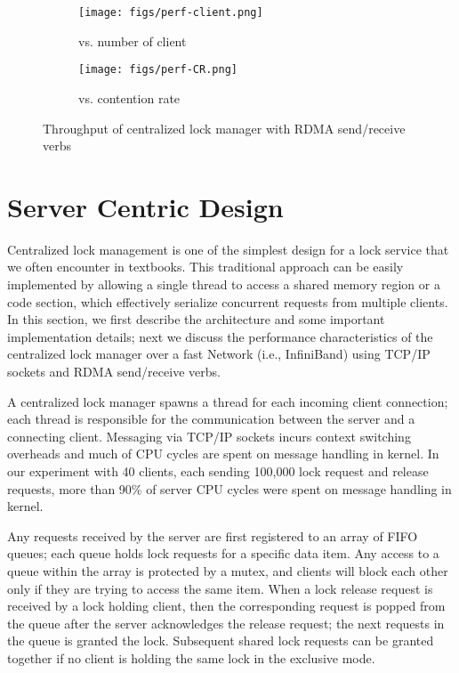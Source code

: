 \documentclass[twoside]{article}
\begin{document}
\begin{multicols}{2}
\begin{figure*}[t!]
\begin{subfigure}{.5\textwidth}
  \centering
  \texttt{[image: figs/perf-client.png]}
  \caption{vs. number of client}
\end{subfigure}\begin{subfigure}{.5\textwidth}
  \centering
  \texttt{[image: figs/perf-CR.png]}
  \caption{vs. contention rate}
\end{subfigure}
\caption{Throughput of centralized lock manager with RDMA send/receive verbs}
\label{fig:server_centric_result}
\end{figure*}
 
\section{Server Centric Design}
Centralized lock management is one of the simplest design for a lock service that we often encounter in textbooks. This traditional approach can be easily implemented by allowing a single thread to access a shared memory region or a code section, which effectively serialize concurrent requests from multiple clients. In this section, we first describe the architecture and some important implementation details; next we discuss the performance characteristics of the centralized lock manager over a fast Network (i.e., InfiniBand) using TCP/IP sockets and RDMA send/receive verbs.

A centralized lock manager spawns a thread for each incoming client connection; each thread is responsible for the communication between the server and a connecting client. Messaging via TCP/IP sockets incurs context switching overheads and much of CPU cycles are spent on message handling in kernel. In our experiment with 40 clients, each sending 100,000 lock request and release requests, more than 90\% of server CPU cycles were spent on message handling in kernel.

Any requests received by the server are first registered to an array of FIFO queues; each queue holds lock requests for a specific data item. Any access to a queue within the array is protected by a mutex, and clients will block each other only if they are trying to access the same item. When a lock release request is received by a lock holding client, then the corresponding request is popped from the queue after the server acknowledges the release request; the next requests in the queue is granted the lock. Subsequent shared lock requests can be granted together if no client is holding the same lock in the exclusive mode.


\end{multicols}
\end{document}

